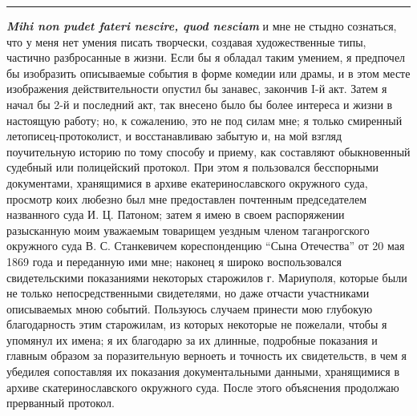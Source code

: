 \par\noindent\rule{\textwidth}{0.4pt}

\textbf{\em Mihi non pudet fateri nescire, quod nesciam} и мне не стыдно сознаться, что у
меня нет умения писать творчески, создавая художественные типы, частично
разбросанные в жизни.  Если бы я обладал таким умением, я предпочел бы
изобразить описываемые события в форме комедии или драмы, и в этом месте
изображения действительности опустил бы занавес, закончив I-й акт.
Затем я начал бы 2-й и последний акт, так внесено было бы более интереса и жизни в настоящую работу;
но, к сожалению, это не под силам мне; я только смиренный летописец-протоколист, и восстанавливаю
забытую и, на мой взгляд поучительную историю по тому способу и приему, как составляют обыкновенный судебный или
полицейский протокол. При этом я пользовался бесспорными документами, хранящимися в архиве екатеринославского
окружного суда, просмотр коих любезно был мне предоставлен почтенным председателем
названного суда И. Ц. Патоном; затем я имею в своем распоряжении разысканную моим уважаемым 
товарищем уездным членом таганрогского окружного суда В. С. Станкевичем кореспонденцию 
``Сына Отечества'' от 20 мая 1869 года и переданную ими мне; наконец я широко воспользовался свидетельскими 
показаниями некоторых старожилов г. Мариуполя, которые были не только непосредственными 
свидетелями, но даже отчасти участниками описываемых мною событий.
Пользуюсь случаем принести мою глубокую благодарность этим старожилам, из
которых некоторые не пожелали, чтобы я упомянул их имена; я их благодарю за их
длинные, подробные показания и главным образом за поразительную верноеть и
точность их свидетельств, в чем я убедилея сопоставляя их показания
документальными данными, хранящимися в архиве скатеринославского окружного
суда. После этого объяснения продолжаю прерванный протокол.

